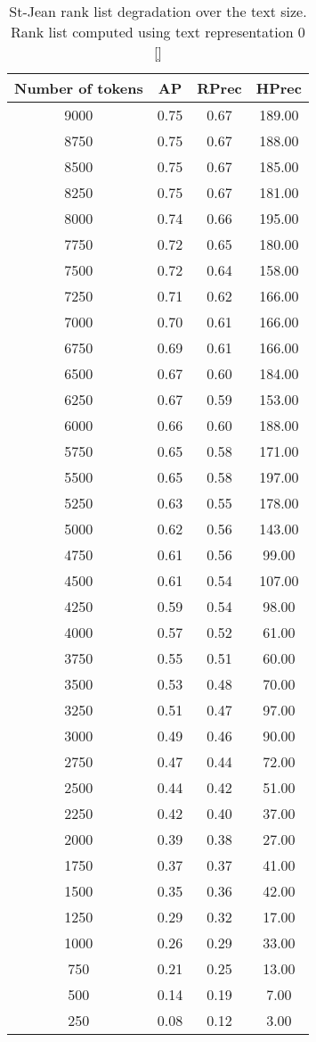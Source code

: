 \begin{table}
  \centering
  \caption{St-Jean rank list degradation over the text size. Rank list computed using text representation 0 \ref{}}
  \label{tab:degradation}

  \begin{tabular}{c|c c c}
    \toprule
    Number of tokens & AP & RPrec & HPrec \\
    \midrule
    9000 & 0.75 & 0.67 & 189.00 \\
    8750 & 0.75 & 0.67 & 188.00 \\
    8500 & 0.75 & 0.67 & 185.00 \\
    8250 & 0.75 & 0.67 & 181.00 \\
    8000 & 0.74 & 0.66 & 195.00 \\
    7750 & 0.72 & 0.65 & 180.00 \\
    7500 & 0.72 & 0.64 & 158.00 \\
    7250 & 0.71 & 0.62 & 166.00 \\
    7000 & 0.70 & 0.61 & 166.00 \\
    6750 & 0.69 & 0.61 & 166.00 \\
    6500 & 0.67 & 0.60 & 184.00 \\
    6250 & 0.67 & 0.59 & 153.00 \\
    6000 & 0.66 & 0.60 & 188.00 \\
    5750 & 0.65 & 0.58 & 171.00 \\
    5500 & 0.65 & 0.58 & 197.00 \\
    5250 & 0.63 & 0.55 & 178.00 \\
    5000 & 0.62 & 0.56 & 143.00 \\
    4750 & 0.61 & 0.56 &  99.00 \\
    4500 & 0.61 & 0.54 & 107.00 \\
    4250 & 0.59 & 0.54 &  98.00 \\
    4000 & 0.57 & 0.52 &  61.00 \\
    3750 & 0.55 & 0.51 &  60.00 \\
    3500 & 0.53 & 0.48 &  70.00 \\
    3250 & 0.51 & 0.47 &  97.00 \\
    3000 & 0.49 & 0.46 &  90.00 \\
    2750 & 0.47 & 0.44 &  72.00 \\
    2500 & 0.44 & 0.42 &  51.00 \\
    2250 & 0.42 & 0.40 &  37.00 \\
    2000 & 0.39 & 0.38 &  27.00 \\
    1750 & 0.37 & 0.37 &  41.00 \\
    1500 & 0.35 & 0.36 &  42.00 \\
    1250 & 0.29 & 0.32 &  17.00 \\
    1000 & 0.26 & 0.29 &  33.00 \\
    750 & 0.21 & 0.25 &  13.00 \\
    500 & 0.14 & 0.19 &   7.00 \\
    250 & 0.08 & 0.12 &   3.00 \\
    \bottomrule
  \end{tabular}
\end{table}

